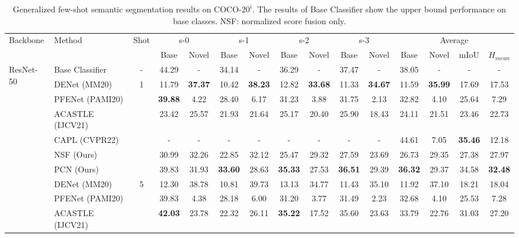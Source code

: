 \documentclass[journal]{IEEEtran}
\begin{document}
\begin{table*}[ht]
    \centering
    \caption{Generalized few-shot semantic segmentation results on COCO-$20^{i}$. The results of Base Classifier show the upper bound performance on base classes. NSF: normalized score fusion only.}
\begin{adjustbox}{max width=\textwidth}
    \begin{tabular}{l|l|c|cccccccc|cccc}
    \hline 
         \multirow{2}{*}{Backbone} & \multirow{2}{*}{Method} & \multirow{2}{*}{Shot} & \multicolumn{2}{c}{s-0} &  \multicolumn{2}{c}{s-1} &  \multicolumn{2}{c}{s-2} &  \multicolumn{2}{c}{s-3} & \multicolumn{4}{c}{Average}  \\
         \cline{4-15}
         & & & Base & Novel & Base & Novel & Base & Novel & Base & Novel & Base & Novel & mIoU & $H_{mean}$ \\
         \hline
         \multirow{11}{*}{ResNet-50} & Base Classifier & - & 44.29 & - &	34.14 & - & 36.29 & - &	37.47 & - & 38.05 & - & - & - \\
         \cline{3-15}
         & DENet (MM20) & \multirow{6}{*}{1} & 11.79 & \textbf{37.37} & 10.42 & \textbf{38.23} & 12.82 & \textbf{33.68} & 11.33 & \textbf{34.67} & 11.59 & \textbf{35.99} & 17.69 & 17.53 \\
         & PFENet (PAMI20) & & \textbf{39.88} & 4.22 & 28.40 & 6.17 & 31.23 & 3.88 & 31.75 & 2.13 & 32.82 & 4.10 & 25.64 & 7.29 \\
         & ACASTLE (IJCV21) & & 23.42 & 25.57 & 21.93 & 21.64 & 25.17 & 20.40 & 25.90 & 18.43 & 24.11 & 21.51 & 23.46 & 22.73 \\
         & CAPL (CVPR22) & & - & - & - & - & - & - & - & - & 44.61 & 7.05 & \textbf{35.46} & 12.18 \\
         & NSF (Ours) & & 30.99 & 32.26 & 22.85 & 32.12 & 25.47 & 29.32 & 27.59 & 23.69 & 26.73 & 29.35 & 27.38 & 27.97 \\
         & PCN (Ours) & & 39.83 & 31.93 & \textbf{33.60} & 28.63 & \textbf{35.33} & 27.53 & \textbf{36.51} & 29.39 & \textbf{36.32} & 29.37 & 34.58 & \textbf{32.48} \\
         \cline{2-15}
         & DENet (MM20) & \multirow{6}{*}{5} & 12.30 & 38.78 & 10.81 & 39.73 & 13.13 & 34.77 & 11.43 & 35.10 & 11.92 & 37.10 & 18.21 & 18.04 \\
         & PFENet (PAMI20) & & 39.83 & 4.38 & 28.18 & 6.00 & 31.20 & 3.77 & 31.49 & 2.23 & 32.68 & 4.10 & 25.53 & 7.28 \\
         & ACASTLE (IJCV21) & & \textbf{42.03} & 23.78 & 22.32 & 26.11 & \textbf{35.22} & 17.52 & 35.60 & 23.63 & 33.79 & 22.76 & 31.03 & 27.20 \\

\end{tabular}
\end{adjustbox}
\end{table*}
\end{document}
